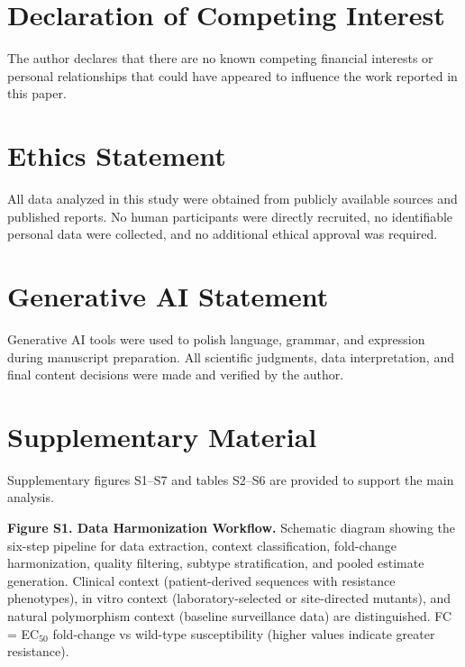 \documentclass[12pt,a4paper]{article}
\begin{document}
\section*{Declaration of Competing Interest}
The author declares that there are no known competing financial interests or personal relationships that could have appeared to influence the work reported in this paper.

\section*{Ethics Statement}
All data analyzed in this study were obtained from publicly available sources and published reports. No human participants were directly recruited, no identifiable personal data were collected, and no additional ethical approval was required.

\section*{Generative AI Statement}
Generative AI tools were used to polish language, grammar, and expression during manuscript preparation. All scientific judgments, data interpretation, and final content decisions were made and verified by the author.

\section*{Supplementary Material}

Supplementary figures S1--S7 and tables S2--S6 are provided to support the main analysis.

\bigskip
\noindent\textbf{Figure S1. Data Harmonization Workflow.}
Schematic diagram showing the six-step pipeline for data extraction, context classification, fold-change harmonization, quality filtering, subtype stratification, and pooled estimate generation. Clinical context (patient-derived sequences with resistance phenotypes), in vitro context (laboratory-selected or site-directed mutants), and natural polymorphism context (baseline surveillance data) are distinguished. FC = EC$_{50}$ fold-change vs wild-type susceptibility (higher values indicate greater resistance).
\end{document}
